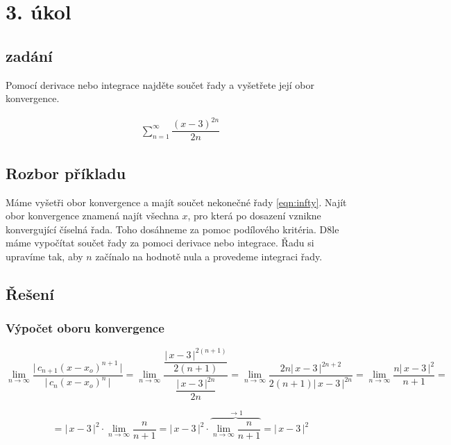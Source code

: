 \section{3. úkol}
\subsection*{zadání}
Pomocí derivace nebo integrace najděte součet řady a vyšetřete její obor konvergence.

\begin{eqnarray}
\sum\limits_{n=1}^\infty \dfrac{(x-3)^{2n}}{2n} \label{eqn:infty}
\end{eqnarray}


\subsection*{Rozbor příkladu}
Máme vyšetři obor konvergence a majít součet nekonečné řady \ref{eqn:infty}. Najít obor konvergence znamená najít všechna $x$, pro která po dosazení vznikne konvergující číselná řada. Toho dosáhneme za pomoc podílového kritéria. D8le máme vypočítat součet řady za pomoci derivace nebo integrace. Řadu si upravíme tak, aby $n$ začínalo na hodnotě nula a provedeme integraci řady.

\subsection*{Řešení}
\subsubsection{Výpočet oboru konvergence}

\begin{displaymath}
\lim_{n \rightarrow \infty} \dfrac{\big |\,c_{n+1}(x - x_o)^{n + 1}\,\big |}{\big | \,c_n(x - x_o)^{n} \, \big |} = 
\lim_{n \rightarrow \infty}  \dfrac{\dfrac{\big |\,x - 3\, \big|^{2(n+1)}}{2(n+1)}}{\dfrac{\big | \, x-3\, \big |^{2n}}{2n}} =
\lim_{n \rightarrow \infty} \dfrac{2n \big |\,x-3\,\big |^{2n+2}}{2(n+1)\big |\,x-3\,\big |^{2n}} = 
\lim_{n \rightarrow \infty}  \frac{n\big |\,x-3\,\big |^{2}}{n+1} = 
\end{displaymath}

\begin{displaymath}
= \big |\,x-3\,\big |^{2}\cdot\lim_{n \rightarrow \infty}  \frac{n}{n+1} =
\big |\,x-3\,\big |^{2}\cdot\overbrace{\lim_{n \rightarrow \infty}  \frac{n}{n+1}}^{\rightarrow 1} = \big |\,x-3\,\big |^{2}
\end{displaymath}
\vspace{18px}

